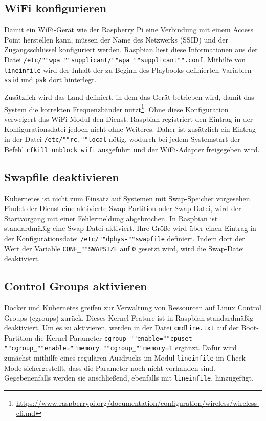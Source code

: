 \subsection{WiFi konfigurieren}\label{subsec:wifi-konfigurieren}

Damit ein WiFi-Gerät wie der Raspberry Pi eine Verbindung mit einem Access Point herstellen kann, müssen der Name des Netzwerks (SSID) und der Zugangsschlüssel konfiguriert werden.
Raspbian liest diese Informationen aus der Datei \texttt{/etc/""wpa\_""supplicant/""wpa\_""supplicant"".conf}.
Mithilfe von \texttt{lineinfile} wird der Inhalt der zu Beginn des Playbooks definierten Variablen \texttt{ssid} und \texttt{psk} dort hinterlegt.

Zusätzlich wird das Land definiert, in dem das Gerät betrieben wird, damit das System die korrekten Frequenzbänder nutzt\footnote{\url{https://www.raspberrypi.org/documentation/configuration/wireless/wireless-cli.md}}.
Ohne diese Konfiguration verweigert das WiFi-Modul den Dienst.
Raspbian registriert den Eintrag in der Konfigurationsdatei jedoch nicht ohne Weiteres.
Daher ist zusätzlich ein Eintrag in der Datei \texttt{/etc/""rc.""local} nötig, wodurch bei jedem Systemstart der Befehl \texttt{rfkill unblock wifi} ausgeführt und der WiFi-Adapter freigegeben wird.

\subsection{Swapfile deaktivieren}\label{subsec:swapfile-deaktivieren}

Kubernetes ist nicht zum Einsatz auf Systemen mit Swap-Speicher vorgesehen.
Findet der Dienst eine aktivierte Swap-Partition oder Swap-Datei, wird der Startvorgang mit einer Fehlermeldung abgebrochen.
In Raspbian ist standardmäßig eine Swap-Datei aktiviert.
Ihre Größe wird über einen Eintrag in der Konfigurationsdatei \texttt{/etc/""dphys-""swapfile} definiert.
Indem dort der Wert der Variable \texttt{CONF\_""SWAPSIZE} auf \texttt{0} gesetzt wird, wird die Swap-Datei deaktiviert.

\subsection{Control Groups aktivieren}\label{subsec:control-groups-aktivieren}

Docker und Kubernetes greifen zur Verwaltung von Ressourcen auf Linux Control Groups (cgroups) zurück.
Dieses Kernel-Feature ist in Raspbian standardmäßig deaktiviert.
Um es zu aktivieren, werden in der Datei \texttt{cmdline.txt} auf der Boot-Partition die Kernel-Parameter \texttt{cgroup\_""enable=""cpuset ""cgroup\_""enable=""memory ""cgroup\_""memory=1} ergänzt.
Dafür wird zunächst mithilfe eines regulären Ausdrucks im Modul \texttt{lineinfile} im Check-Mode sichergestellt, dass die Parameter noch nicht vorhanden sind.
Gegebenenfalls werden sie anschließend, ebenfalls mit \texttt{lineinfile}, hinzugefügt.

